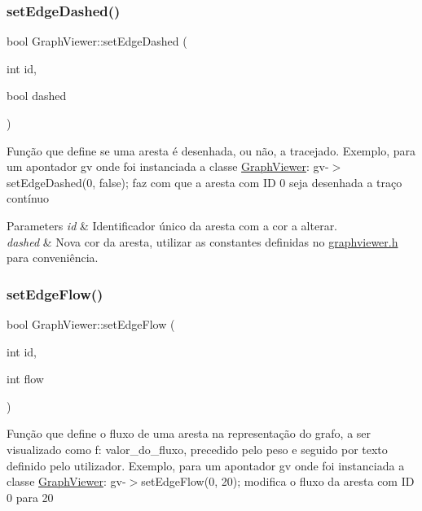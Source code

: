\subsubsection{\texorpdfstring{set\+Edge\+Dashed()}{setEdgeDashed()}}
{\footnotesize\ttfamily bool Graph\+Viewer\+::set\+Edge\+Dashed (\begin{DoxyParamCaption}\item[{int}]{id,  }\item[{bool}]{dashed }\end{DoxyParamCaption})}

Função que define se uma aresta é desenhada, ou não, a tracejado. Exemplo, para um apontador gv onde foi instanciada a classe \hyperlink{class_graph_viewer}{Graph\+Viewer}\+: gv-\/$>$set\+Edge\+Dashed(0, false); faz com que a aresta com ID 0 seja desenhada a traço contínuo


\begin{DoxyParams}{Parameters}
{\em id} & Identificador único da aresta com a cor a alterar. \\
\hline
{\em dashed} & Nova cor da aresta, utilizar as constantes definidas no \hyperlink{graphviewer_8h_source}{graphviewer.\+h} para conveniência. \\
\hline
\end{DoxyParams}
\mbox{\label{class_graph_viewer_a69eb065145063e4dea41961e92e35c8e}} 
\subsubsection{\texorpdfstring{set\+Edge\+Flow()}{setEdgeFlow()}}
{\footnotesize\ttfamily bool Graph\+Viewer\+::set\+Edge\+Flow (\begin{DoxyParamCaption}\item[{int}]{id,  }\item[{int}]{flow }\end{DoxyParamCaption})}

Função que define o fluxo de uma aresta na representação do grafo, a ser visualizado como f\+: valor\+\_\+do\+\_\+fluxo, precedido pelo peso e seguido por texto definido pelo utilizador. Exemplo, para um apontador gv onde foi instanciada a classe \hyperlink{class_graph_viewer}{Graph\+Viewer}\+: gv-\/$>$set\+Edge\+Flow(0, 20); modifica o fluxo da aresta com ID 0 para 20


